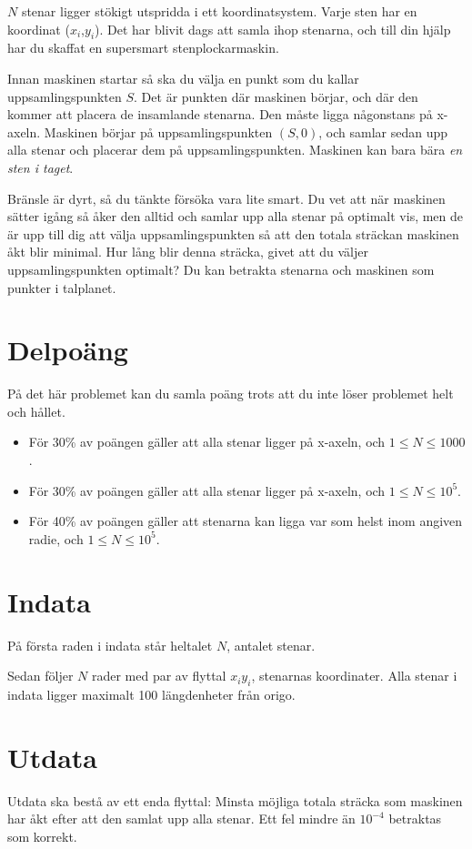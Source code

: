 
$N$ stenar ligger stökigt utspridda i ett koordinatsystem. Varje sten har en koordinat ($x_i$,$y_i$). Det har blivit dags att samla ihop stenarna, och till din hjälp har du skaffat en supersmart stenplockarmaskin.

Innan maskinen startar så ska du välja en punkt som du kallar uppsamlingspunkten $S$. Det är punkten där maskinen börjar, och där den kommer att placera de insamlande stenarna. Den måste ligga någonstans på x-axeln. Maskinen börjar på uppsamlingspunkten $(S,0)$, och samlar sedan upp alla stenar och placerar dem på uppsamlingspunkten. Maskinen kan bara bära \emph{en sten i taget}.

Bränsle är dyrt, så du tänkte försöka vara lite smart. Du vet att när maskinen sätter igång så åker den alltid och samlar upp alla stenar på optimalt vis, men de är upp till dig att välja uppsamlingspunkten så att den totala sträckan maskinen åkt blir minimal. Hur lång blir denna sträcka, givet att du väljer uppsamlingspunkten optimalt? Du kan betrakta stenarna och maskinen som punkter i talplanet.

\section*{Delpoäng}
På det här problemet kan du samla poäng trots att du inte löser problemet helt och hållet.

\begin{itemize}
\item För 30\% av poängen gäller att alla stenar ligger på x-axeln, och $1 \leq N \leq 1000$.
\item För 30\% av poängen gäller att alla stenar ligger på x-axeln, och $1 \leq N \leq 10^5$.
\item För 40\% av poängen gäller att stenarna kan ligga var som helst inom angiven radie, och $1 \leq N \leq 10^5$.
\end{itemize}

\section*{Indata}
På första raden i indata står heltalet $N$, antalet stenar.

Sedan följer $N$ rader med par av flyttal $x_i y_i$, stenarnas koordinater. Alla stenar i indata ligger maximalt 100 längdenheter från origo.
\section*{Utdata}
Utdata ska bestå av ett enda flyttal: Minsta möjliga totala sträcka som maskinen har åkt efter att den samlat upp alla stenar. Ett fel mindre än $10^{-4}$ betraktas som korrekt.

